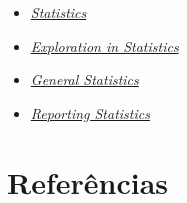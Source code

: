 \documentclass[
]{book}
\begin{document}
\begin{itemize}
\item
  \href{https://journals.physiology.org/topic/advances-collections/statistics?seriesKey=\&tagCode=\&}{\emph{Statistics}}
\item
  \href{https://journals.physiology.org/topic/advances-collections/explorations-in-statistics?seriesKey=\&tagCode=\&}{\emph{Exploration in Statistics}}
\item
  \href{https://journals.physiology.org/topic/advances-collections/general-statistics?seriesKey=\&tagCode=\&}{\emph{General Statistics}}
\item
  \href{https://journals.physiology.org/topic/advances-collections/reporting-statistics?seriesKey=\&tagCode=\&}{\emph{Reporting Statistics}}
\end{itemize}

\hypertarget{referencias}{%
\chapter{\texorpdfstring{\textbf{Referências}}{Referências}}\label{referencias}}
\end{document}
